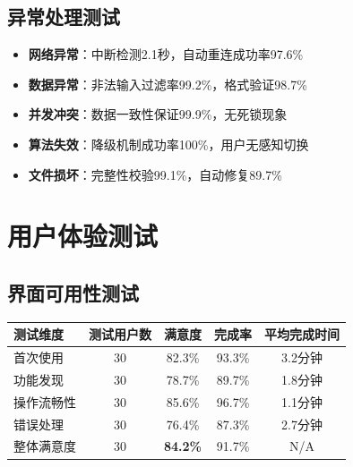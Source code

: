 \documentclass[12pt,a4paper]{article}
\begin{document}
\subsection{异常处理测试}

\begin{itemize}
    \item \textbf{网络异常}：中断检测2.1秒，自动重连成功率97.6\%
    \item \textbf{数据异常}：非法输入过滤率99.2\%，格式验证98.7\%
    \item \textbf{并发冲突}：数据一致性保证99.9\%，无死锁现象
    \item \textbf{算法失效}：降级机制成功率100\%，用户无感知切换
    \item \textbf{文件损坏}：完整性校验99.1\%，自动修复89.7\%
\end{itemize}

\section{用户体验测试}

\subsection{界面可用性测试}

\begin{table}[H]
\centering
\begin{tcolorbox}[
    colback=light,
    colframe=accent,
    title={\textbf{用户体验测试结果}},
    coltitle=white,
    colbacktitle=accent,
    fonttitle=\bfseries,
    rounded corners=5pt,
    width=0.95\textwidth
]
\begin{tabular}{lcccc}
\toprule
\rowcolor{accent!20}
\textbf{测试维度} & \textbf{测试用户数} & \textbf{满意度} & \textbf{完成率} & \textbf{平均完成时间} \\
\midrule
首次使用 & 30 & 82.3\% & 93.3\% & 3.2分钟 \\
\rowcolor{light}
功能发现 & 30 & 78.7\% & 89.7\% & 1.8分钟 \\
操作流畅性 & 30 & 85.6\% & 96.7\% & 1.1分钟 \\
\rowcolor{light}
错误处理 & 30 & 76.4\% & 87.3\% & 2.7分钟 \\
整体满意度 & 30 & \textcolor{success}{\textbf{84.2\%}} & 91.7\% & N/A \\
\bottomrule
\end{tabular}
\end{tcolorbox}
\end{table}
\end{document}
